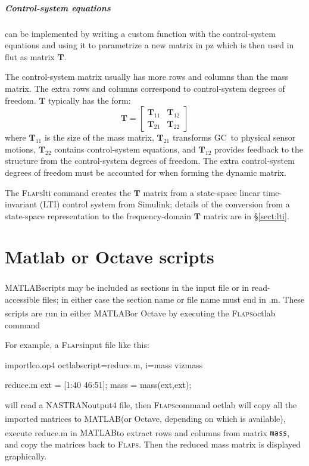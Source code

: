 \documentclass[10pt,openany,twoside]{book}
\numberwithin{equation}{section}   %
\newcommand{\Cmd}[1]{{\sf #1}}
\newcommand{\Code}[1]{{\small\tt #1}}
\newcommand{\Matrix}[1]{\boldsymbol{#1}}
\newcommand{\Gc}{GC}
\newcommand{\Flaps}{{\normalfont\scshape Flaps\:}}
\newcommand{\Matlab}{{\footnotesize{MATLAB\textsuperscript{\textregistered}}\:}}
\newcommand{\Octlab}{\Cmd{matlab}/\Cmd{octave}\:}
\newcommand{\Nastran}{{\footnotesize{NASTRAN\:}}}
\newcommand{\Sectref}[1]{\S\ref{#1}}
\begin{document}
\subparagraph{Control-system equations}
can be implemented by writing a custom function
with the control-system equations
and using it to parametrize a new matrix in
\Cmd{pz} which is then used in \Cmd{flut} as matrix $\Matrix{T}$.

The control-system matrix usually has more rows and columns than the
mass matrix. The extra rows and columns correspond to control-system
degrees of freedom. $\Matrix{T}$ typically has the form:
\begin{equation}
\Matrix{T} = \left[ \begin{array}{cc}
			\Matrix{T}_{11}     &   \Matrix{T}_{12} \\
	      \Matrix{T}_{21}     &   \Matrix{T}_{22}
		\end{array} \right]
\end{equation}
where $\Matrix{T}_{11}$ is the size of the mass matrix,
$\Matrix{T}_{21}$ transforms \Gc\ to physical sensor motions,
$\Matrix{T}_{22}$ contains control-system equations, and $\Matrix{T}_{12}$ provides
feedback to the structure from the control-system degrees of freedom.
The extra control-system degrees of freedom must be accounted for when
forming the dynamic matrix.
\par
The \Flaps \Cmd{lti} command creates the $\Matrix{T}$ matrix
from a state-space linear time-invariant (LTI) control system from Simulink;
details of the conversion from a state-space
representation to the frequency-domain $\Matrix{T}$ matrix are in
\Sectref{sect:lti}.

\section{Matlab or Octave scripts}
\index{matlab@\Octlab!scripts}
\Matlab scripts may be included as sections in the input file or
in read-accessible files; in either case the section name or file
name must end in .m. These scripts are run in either \Matlab or
Octave by executing the \Flaps \Cmd{octlab} command

For example, a \Flaps input file like this:
\begin{example}
   import{lco.op4}
   octlab{script=reduce.m, i=mass}
   viz{mass}

reduce.m {{
ext = [1:40 46:51];
mass = mass(ext,ext);
}}
\end{example}
will read a \Nastran output4 file,
then \Flaps command \Cmd{octlab} will copy all the imported matrices
to \Matlab (or Octave, depending on which is available), execute
reduce.m in \Matlab to extract rows and columns from matrix \Code{mass},
and copy the matrices back
to \Flaps. Then the reduced mass matrix is displayed graphically.
\end{document}
